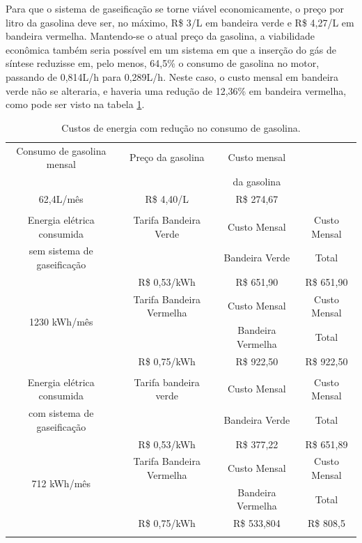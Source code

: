 Para que o sistema de gaseificação se torne viável economicamente, o preço por litro da gasolina deve ser, no máximo, R\$ 3/L em bandeira verde e R\$ 4,27/L em bandeira vermelha. Mantendo-se o atual preço da gasolina, a viabilidade econômica também seria possível em um sistema em que a inserção do gás de síntese reduzisse em, pelo menos, 64,5\% o consumo de gasolina no motor, passando de 0,814L/h para 0,289L/h. Neste caso, o custo mensal em bandeira verde não se alteraria, e haveria uma redução de 12,36\% em bandeira vermelha, como pode ser visto na tabela \ref{custos_reducao_gasolina}.

\begin{table}[h]
	\centering
	\caption{Custos de energia com redução no consumo de gasolina.}
	\begin{tabular}{|c|c|c|c|}
		\hline
		Consumo de gasolina mensal & Preço da gasolina & Custo mensal &\\
		& & da gasolina & \\
		62,4L/mês & R\$ 4,40/L & R\$ 274,67 &\\
		\hline
		\rowcolor{gray} \multicolumn{4}{|c|}{} \\
		\hline
		Energia elétrica consumida & Tarifa Bandeira Verde & Custo Mensal & Custo Mensal\\
		sem sistema de gaseificação & & Bandeira Verde & Total\\
		\multirow{4}{*}{1230 kWh/mês} & R\$ 0,53/kWh &  R\$ 651,90 & \cellcolor{lightgray} R\$ 651,90 \\
		\cline{2-3}
		& Tarifa Bandeira Vermelha & Custo Mensal & Custo Mensal\\
		& & Bandeira Vermelha & Total\\
		& R\$ 0,75/kWh &  R\$ 922,50 & \cellcolor{lightgray} R\$ 922,50 \\
		\hline
		\rowcolor{gray} \multicolumn{4}{|c|}{} \\
		\hline
		Energia elétrica consumida & Tarifa bandeira verde & Custo Mensal & Custo Mensal \\
		com sistema de gaseificação & & Bandeira Verde & Total\\
		\multirow{4}{*}{712 kWh/mês} & R\$ 0,53/kWh & R\$ 377,22 & \cellcolor{lightgray} R\$ 651,89\\
		\cline{2-4}
		& Tarifa Bandeira Vermelha & Custo Mensal & Custo Mensal\\
		& & Bandeira Vermelha &  Total \\
		& R\$ 0,75/kWh & R\$ 533,804 & \cellcolor{lightgray}R\$ 808,5\\
		\hline
		\rowcolor{gray} \multicolumn{4}{|c|}{} \\
		\hline
	\end{tabular}
	\label{custos_reducao_gasolina}
\end{table}	
